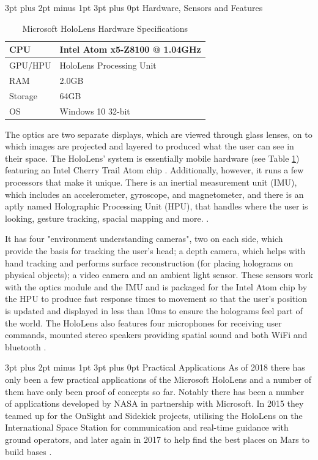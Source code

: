 \documentclass[12pt,a4paper]{article}
\makeatletter
\renewcommand\subsubsection{\@startsection {subsubsection}{1}{0mm} %
	                           {3pt plus 2pt minus 1pt} %
	                           {3pt plus 0pt} %
	                           {\normalfont\bfseries}}
\makeatother
\begin{document}
\subsubsection{Hardware, Sensors and Features}
\begin{table}[!h]
	\renewcommand{\arraystretch}{1.3}
	\caption{Microsoft HoloLens Hardware Specifications}
	\label{hardware}
	\centering
	\begin{tabular}{l|l}
		\toprule
		CPU & Intel Atom x5-Z8100 @ 1.04GHz\\ \hline
		GPU/HPU & HoloLens Processing Unit \\ \hline
		RAM & 2.0GB\\ \hline
		Storage & 64GB\\ \hline
		OS & Windows 10 32-bit\\ \bottomrule
	\end{tabular}
\end{table}
The optics are two separate displays, which are viewed through glass lenses, on to which images are projected and layered to produced what the user can see in their space. The HoloLens' system is essentially mobile hardware (see Table \ref{hardware}) featuring an Intel Cherry Trail Atom chip \cite{rubino16}. Additionally, however, it runs a few processors that make it unique. There is an inertial measurement unit (IMU), which includes an accelerometer, gyroscope, and magnetometer, and there is an aptly named Holographic Processing Unit (HPU), that handles where the user is looking, gesture tracking, spacial mapping and more. \cite{holmdahl15}.

It has four "environment understanding cameras", two on each side, which provide the basis for tracking the user's head; a depth camera, which helps with hand tracking and performs surface reconstruction (for placing holograms on physical objects); a video camera and an ambient light sensor. These sensors work with the optics module and the IMU and is packaged for the Intel Atom chip by the HPU to produce fast response times to movement so that the user's position is updated and displayed in less than 10ms to ensure the holograms feel part of the world. The HoloLens also features four microphones for receiving user commands, mounted stereo speakers providing spatial sound and both WiFi and bluetooth \cite{colaner16}.

\subsubsection{Practical Applications}
As of 2018 there has only been a few practical applications of the Microsoft HoloLens and a number of them have only been proof of concepts so far. Notably there has been a number of applications developed by NASA in partnership with Microsoft. In 2015 they teamed up for the OnSight and Sidekick projects, utilising the HoloLens on the International Space Station for communication and real-time guidance with ground operators, and later again in 2017 to help find the best places on Mars to build bases \cite{nasa15, microsoftnews17}.
\end{document}
